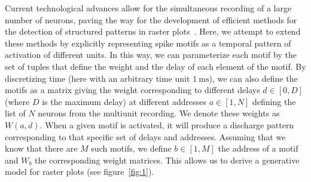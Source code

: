 \documentclass[11pt]{article}
\newcommand{\ms}{\si{\milli\second}}%
\begin{document}
Current technological advances allow for the simultaneous recording of a large number of neurons, paving the way for the development of efficient methods for the detection of structured patterns in raster plots~\parencite{russo_cell_2017, stella_3d-spade_2019}. Here, we attempt to extend these methods by explicitly representing spike motifs as a temporal pattern of activation of different units. In this way, we can parameterize each motif by the set of tuples that define the weight and the delay of each element of the motif. By discretizing time (here with an arbitrary time unit $1~\ms$), we can also define the motifs as a matrix giving the weight corresponding to different delays $d \in [0, D]$ (where $D$ is the maximum delay) at different addresses $a \in [1, N]$ defining the list of $N$ neurons from the multiunit recording. We denote these weights as $W(a, d)$. When a given motif is activated, it will produce a discharge pattern corresponding to that specific set of delays and addresses. Assuming that we know that there are $M$ such motifs, we define $b \in [1, M]$ the address of a motif and $W_b$ the corresponding weight matrices. This allows us to derive a generative model for raster plots (see figure~\ref{fig:1}).
\end{document}
